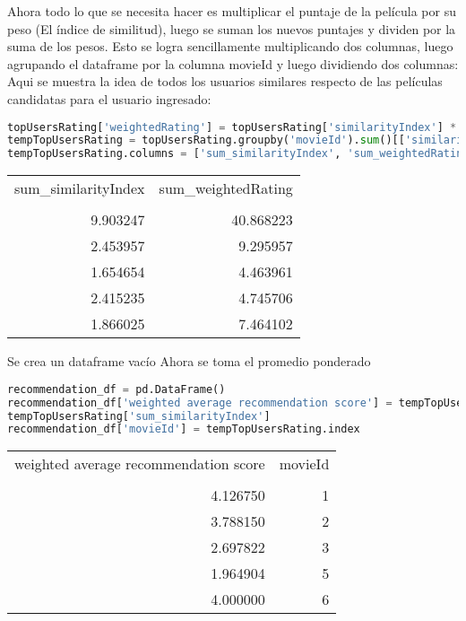 \documentclass{uimppracticas}
\begin{document}
Ahora todo lo que se necesita hacer es multiplicar el puntaje de la película por su peso (El índice de similitud), luego se suman los nuevos puntajes y dividen por la suma de los pesos.
Esto se logra sencillamente multiplicando dos columnas, luego agrupando el dataframe por la columna movieId y luego dividiendo dos columnas:
Aqui se muestra la idea de todos los usuarios similares respecto de las películas candidatas para el usuario ingresado:

\begin{lstlisting}[language=python]
topUsersRating['weightedRating'] = topUsersRating['similarityIndex'] * topUsersRating['rating']
tempTopUsersRating = topUsersRating.groupby('movieId').sum()[['similarityIndex', 'weightedRating']]
tempTopUsersRating.columns = ['sum_similarityIndex', 'sum_weightedRating']
\end{lstlisting}

\begin{tabular}{rr}
	\toprule
	sum\_similarityIndex &  sum\_weightedRating \\
	&                     \\
	\midrule
	9.903247 &           40.868223 \\
	2.453957 &            9.295957 \\
	1.654654 &            4.463961 \\
	2.415235 &            4.745706 \\
	1.866025 &            7.464102 \\
	\bottomrule
\end{tabular}

Se crea un dataframe vacío
Ahora se toma el promedio ponderado

\begin{lstlisting}[language=python]
recommendation_df = pd.DataFrame()
recommendation_df['weighted average recommendation score'] = tempTopUsersRating['sum_weightedRating'] / \
tempTopUsersRating['sum_similarityIndex']
recommendation_df['movieId'] = tempTopUsersRating.index
\end{lstlisting}

\begin{tabular}{rr}
	\toprule
	weighted average recommendation score &  movieId \\
	&          \\
	\midrule
	4.126750 &        1 \\
	3.788150 &        2 \\
	2.697822 &        3 \\
	1.964904 &        5 \\
	4.000000 &        6 \\
	\bottomrule
\end{tabular}
\end{document}
